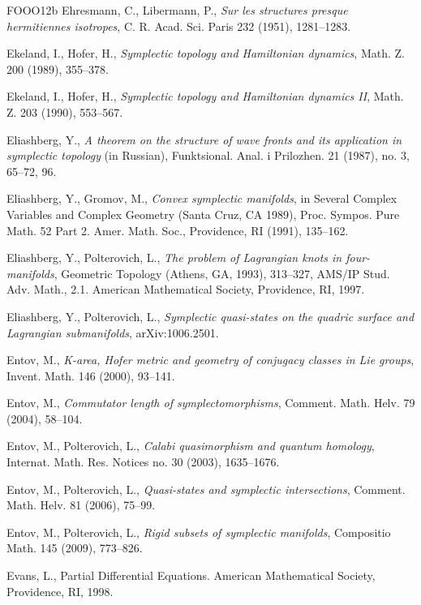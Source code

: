 \begin{thebibliography}{FOOO12b}
 Ehresmann, C., Libermann, P., \emph{Sur les structures presque hermitiennes
  isotropes}, C. R. Acad. Sci. Paris 232 (1951), 1281–1283.

 Ekeland, I., Hofer, H., \emph{Symplectic topology and Hamiltonian dynamics}, Math.
  Z. 200 (1989), 355–378.

 Ekeland, I., Hofer, H., \emph{Symplectic topology and Hamiltonian dynamics II},
  Math. Z. 203 (1990), 553–567.

 Eliashberg, Y., \emph{A theorem on the structure of wave fronts and its
  applica\-tion in symplectic topology} (in Russian), Funktsional. Anal. i Prilozhen. 21 (1987), no. 3,
  65–72, 96.

 Eliashberg, Y., Gromov, M., \emph{Convex symplectic manifolds}, in Several Complex
  Variables and Complex Geometry (Santa Cruz, CA 1989), Proc. Sympos. Pure Math. 52 Part 2. Amer. Math.
  Soc., Providence, RI (1991), 135–162.

 Eliashberg, Y., Polterovich, L., \emph{The problem of Lagrangian knots in
  four-manifolds}, Geometric Topology (Athens, GA, 1993), 313–327, AMS/IP Stud. Adv. Math., 2.1. American
  Mathematical Society, Providence, RI, 1997.

 Eliashberg, Y., Polterovich, L., \emph{Symplectic quasi-states on the quadric
  surface and Lagrangian submanifolds}, arXiv:1006.2501.

 Entov, M., \emph{K-area, Hofer metric and geometry of conjugacy classes in Lie
  groups}, Invent. Math. 146 (2000), 93–141.

 Entov, M., \emph{Commutator length of symplectomorphisms}, Comment. Math. Helv. 79
  (2004), 58–104.

 Entov, M., Polterovich, L., \emph{Calabi quasimorphism and quantum homol\-ogy},
  Internat. Math. Res. Notices no. 30 (2003), 1635–1676.

 Entov, M., Polterovich, L., \emph{Quasi-states and symplectic intersections},
  Comment. Math. Helv. 81 (2006), 75–99.

 Entov, M., Polterovich, L., \emph{Rigid subsets of symplectic manifolds},
  Com\-positio Math. 145 (2009), 773–826.

 Evans, L., Partial Diﬀerential Equations. American Mathematical Soci\-ety,
  Providence, RI, 1998.


\end{thebibliography}
